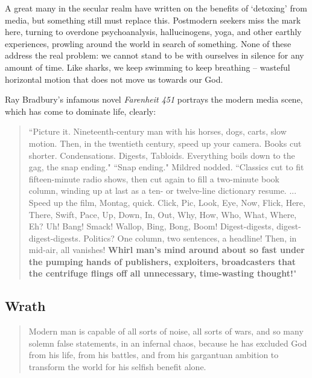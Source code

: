 \documentclass[letterpaper]{article}
\begin{document}
    A great many in the secular realm have written on the benefits of `detoxing' from media, but something still must replace this. Postmodern seekers miss the mark here, turning to overdone psychoanalysis, hallucinogens, yoga, and other earthly experiences, prowling around the world in search of something. None of these address the real problem: we cannot stand to be with ourselves in silence for any amount of time. Like sharks, we keep swimming to keep breathing -- wasteful horizontal motion that does not move us towards our God.

    Ray Bradbury's infamous novel \textit{Farenheit 451} portrays the modern media scene, which has come to dominate life, clearly:

    \begin{quote}
      ``Picture it. Nineteenth-century man with his horses, dogs, carts, slow motion. Then, in the twentieth century, speed up your camera. Books cut shorter. Condensations. Digests, Tabloids. Everything boils down to the gag, the snap ending." ``Snap ending." Mildred nodded. ``Classics cut to fit fifteen-minute radio shows, then cut again to fill a two-minute book column, winding up at last as a ten- or twelve-line dictionary resume. ... Speed up the film, Montag, quick. Click, Pic, Look, Eye, Now, Flick, Here, There, Swift, Pace, Up, Down, In, Out, Why, How, Who, What, Where, Eh? Uh! Bang! Smack! Wallop, Bing, Bong, Boom! Digest-digests, digest-digest-digests. Politics? One column, two sentences, a headline! Then, in mid-air, all vanishes! \textbf{Whirl man’s mind around about so fast under the pumping hands of publishers, exploiters, broadcasters that the centrifuge flings off all unnecessary, time-wasting thought!}"
    \end{quote}


  \subsection{Wrath}

    \begin{quote}
      Modern man is capable of all sorts of noise, all sorts of wars, and so many solemn false statements, in an infernal chaos, because he has excluded God from his life, from his battles, and from his gargantuan ambition to transform the world for his selfish benefit alone.
    \end{quote}
\end{document}
